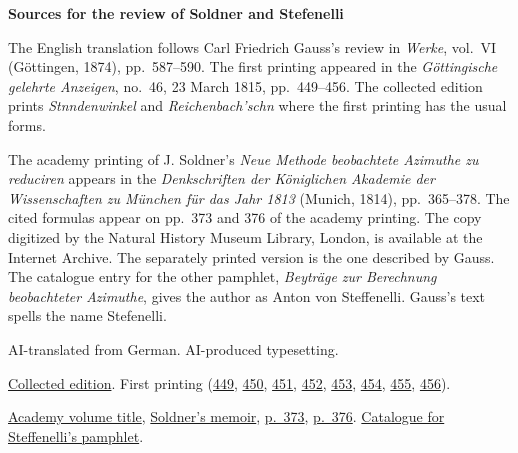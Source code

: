 \clearpage\thispagestyle{empty}
\begin{center}\Large\bfseries Sources for the review of Soldner and Stefenelli\end{center}

The English translation follows Carl Friedrich Gauss's review in \emph{Werke}, vol.~VI (Göttingen, 1874), pp.~587--590. The first printing appeared in the \emph{Göttingische gelehrte Anzeigen}, no.~46, 23 March 1815, pp.~449--456. The collected edition prints \emph{Stnndenwinkel} and \emph{Reichenbach'schn} where the first printing has the usual forms.

The academy printing of J. Soldner's \emph{Neue Methode beobachtete Azimuthe zu reduciren} appears in the \emph{Denkschriften der Königlichen Akademie der Wissenschaften zu München für das Jahr 1813} (Munich, 1814), pp.~365--378. The cited formulas appear on pp.~373 and 376 of the academy printing. The copy digitized by the Natural History Museum Library, London, is available at the Internet Archive. The separately printed version is the one described by Gauss. The catalogue entry for the other pamphlet, \emph{Beyträge zur Berechnung beobachteter Azimuthe}, gives the author as Anton von Steffenelli. Gauss's text spells the name Stefenelli.

AI-translated from German. AI-produced typesetting.

\href{https://gdz.sub.uni-goettingen.de/id/PPN236007467}{Collected edition}. First printing (\href{https://images.p.sub.uni-goettingen.de/iiif/image/gdz:PPN319721507_1815:00000453/full/1650,/0/default.jpg}{449}, \href{https://images.p.sub.uni-goettingen.de/iiif/image/gdz:PPN319721507_1815:00000454/full/1650,/0/default.jpg}{450}, \href{https://images.p.sub.uni-goettingen.de/iiif/image/gdz:PPN319721507_1815:00000455/full/1650,/0/default.jpg}{451}, \href{https://images.p.sub.uni-goettingen.de/iiif/image/gdz:PPN319721507_1815:00000456/full/1650,/0/default.jpg}{452}, \href{https://images.p.sub.uni-goettingen.de/iiif/image/gdz:PPN319721507_1815:00000457/full/1650,/0/default.jpg}{453}, \href{https://images.p.sub.uni-goettingen.de/iiif/image/gdz:PPN319721507_1815:00000458/full/1650,/0/default.jpg}{454}, \href{https://images.p.sub.uni-goettingen.de/iiif/image/gdz:PPN319721507_1815:00000459/full/1650,/0/default.jpg}{455}, \href{https://images.p.sub.uni-goettingen.de/iiif/image/gdz:PPN319721507_1815:00000460/full/1650,/0/default.jpg}{456}).

\href{https://archive.org/details/denkschriftender04munc/page/n8/mode/1up}{Academy volume title},
\href{https://archive.org/download/denkschriftender04munc/page/365.jpg}{Soldner's memoir},
\href{https://archive.org/download/denkschriftender04munc/page/373.jpg}{p.~373},
\href{https://archive.org/download/denkschriftender04munc/page/376.jpg}{p.~376}.
\href{https://books.google.com/books?id=z2Y_AAAAcAAJ}{Catalogue for Steffenelli's pamphlet}.

\clearpage
